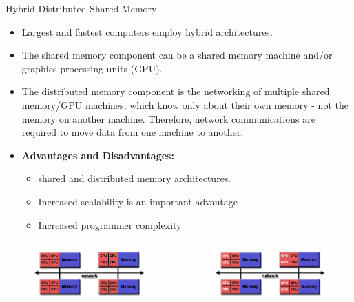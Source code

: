 \documentclass[10pt,times]{beamer}
\begin{document}
\begin{frame}{Hybrid Distributed-Shared Memory}
\begin{itemize}
\item Largest and fastest computers employ hybrid architectures.
\item The shared memory component can be a shared memory machine and/or graphics 
    processing units (GPU).

\item The distributed memory component is the networking of multiple shared 
memory/GPU machines, which know only about their own memory - not the memory on 
another machine. Therefore, network communications are required to move data from 
one machine to another.

\item \textbf{Advantages and Disadvantages:}

\begin{itemize}
\item shared and distributed memory architectures.
\item Increased scalability is an important advantage
\item Increased programmer complexity
\end{itemize}
\end{itemize}
\begin{columns}
\begin{figure}
\includegraphics[width=\linewidth]{figs/hybrid_mem.png}
\end{figure}
\begin{figure}
\includegraphics[width=\linewidth]{figs/hybrid_gpu.png}
\end{figure}
\end{columns}
\end{frame}
\end{document}
